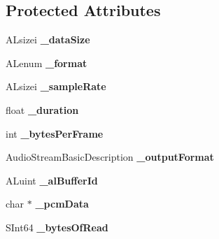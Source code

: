 \subsection*{Protected Attributes}
\begin{DoxyCompactItemize}
\item 
\mbox{\label{classexperimental_1_1AudioCache_a22fc60721a1c185690b32e45102467bc}} 
A\+Lsizei {\bfseries \+\_\+data\+Size}
\item 
\mbox{\label{classexperimental_1_1AudioCache_a86ca5701daeac877093ccd0c60cfd41c}} 
A\+Lenum {\bfseries \+\_\+format}
\item 
\mbox{\label{classexperimental_1_1AudioCache_a7e96ed4cd52ae83c479e4f9d1508613e}} 
A\+Lsizei {\bfseries \+\_\+sample\+Rate}
\item 
\mbox{\label{classexperimental_1_1AudioCache_a153a613ba3ad298b787c75132ae1c788}} 
float {\bfseries \+\_\+duration}
\item 
\mbox{\label{classexperimental_1_1AudioCache_ab856fdf9fe909800d23e5c8411406306}} 
int {\bfseries \+\_\+bytes\+Per\+Frame}
\item 
\mbox{\label{classexperimental_1_1AudioCache_abd3c8d25a3681a88ebcce210c8a17170}} 
Audio\+Stream\+Basic\+Description {\bfseries \+\_\+output\+Format}
\item 
\mbox{\label{classexperimental_1_1AudioCache_a9bad4d9f68eba3672e7562f80a5bcdb0}} 
A\+Luint {\bfseries \+\_\+al\+Buffer\+Id}
\item 
\mbox{\label{classexperimental_1_1AudioCache_af9d8ea45a3e8f85016be333425a38eb9}} 
char $\ast$ {\bfseries \+\_\+pcm\+Data}
\item 
\mbox{\label{classexperimental_1_1AudioCache_a119d82e9519167b1dfb25c134e29fd18}} 
S\+Int64 {\bfseries \+\_\+bytes\+Of\+Read}
\item 
\mbox{\label{classexperimental_1_1AudioCache_a713550b21f694c8e80d63c705ed3b57b}} 

\end{DoxyCompactItemize}
